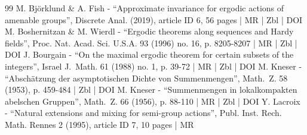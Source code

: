 \documentclass[10pt]{amsart}
\theoremstyle{plain}
\theoremstyle{definition}
\begin{document}
\begin{thebibliography}{99}
M. Björklund \& A. Fish - “Approximate invariance for ergodic actions of amenable groups”, Discrete Anal. (2019), article ID 6, 56 pages | MR | Zbl | DOI
M. Boshernitzan \& M. Wierdl - “Ergodic theorems along sequences and Hardy fields”, Proc. Nat. Acad. Sci. U.S.A. 93 (1996) no. 16, p. 8205-8207 | MR | Zbl | DOI
J. Bourgain - “On the maximal ergodic theorem for certain subsets of the integers”, Israel J. Math. 61 (1988) no. 1, p. 39-72 | MR | Zbl | DOI
M. Kneser - “Abschätzung der asymptotischen Dichte von Summenmengen”, Math. Z. 58 (1953), p. 459-484 | Zbl | DOI
M. Kneser - “Summenmengen in lokalkompakten abelschen Gruppen”, Math. Z. 66 (1956), p. 88-110 | MR | Zbl | DOI
Y. Lacroix - “Natural extensions and mixing for semi-group actions”, Publ. Inst. Rech. Math. Rennes 2 (1995), article ID 7, 10 pages | MR
\end{thebibliography}
\end{document}
